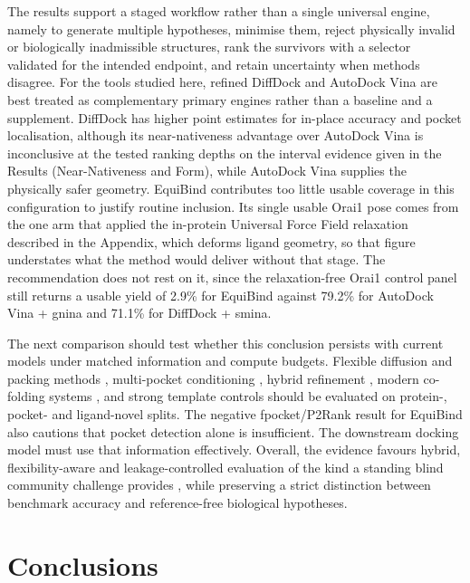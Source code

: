 The results support a staged workflow rather than a single universal engine, namely to generate multiple hypotheses, minimise them, reject physically invalid or biologically inadmissible structures, rank the survivors with a selector validated for the intended endpoint, and retain uncertainty when methods disagree. For the tools studied here, refined DiffDock and AutoDock Vina are best treated as complementary primary engines rather than a baseline and a supplement. DiffDock has higher point estimates for in-place accuracy and pocket localisation, although its near-nativeness advantage over AutoDock Vina is inconclusive at the tested ranking depths on the interval evidence given in the Results (Near-Nativeness and Form), while AutoDock Vina supplies the physically safer geometry. EquiBind contributes too little usable coverage in this configuration to justify routine inclusion. Its single usable Orai1 pose comes from the one arm that applied the in-protein Universal Force Field relaxation described in the Appendix, which deforms ligand geometry, so that figure understates what the method would deliver without that stage. The recommendation does not rest on it, since the relaxation-free Orai1 control panel still returns a usable yield of 2.9\% for EquiBind against 79.2\% for AutoDock Vina + gnina and 71.1\% for DiffDock + smina.

The next comparison should test whether this conclusion persists with current models under matched information and compute budgets. Flexible diffusion and packing methods \cite{ref031}, multi-pocket conditioning \cite{ref066}, hybrid refinement \cite{ref064}, modern co-folding systems \cite{ref012}, \cite{ref069} and strong template controls \cite{ref065} should be evaluated on protein-, pocket- and ligand-novel splits. The negative fpocket/P2Rank result for EquiBind also cautions that pocket detection alone is insufficient. The downstream docking model must use that information effectively. Overall, the evidence favours hybrid, flexibility-aware and leakage-controlled evaluation of the kind a standing blind community challenge provides \cite{ref047}, while preserving a strict distinction between benchmark accuracy and reference-free biological hypotheses.

\hypertarget{conclusions}{%
\chapter{\texorpdfstring{Conclusions }{Conclusions }}\label{conclusions}}

